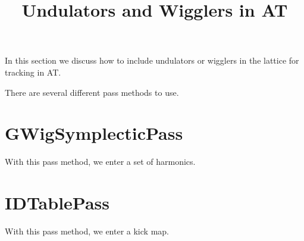 \documentclass[acus]{article}
\begin{document}
\title{Undulators and Wigglers in AT}
\maketitle

In this section we discuss how to include undulators or wigglers in the lattice for tracking in AT.

There are several different pass methods to use.
\section{GWigSymplecticPass}
With this pass method, we enter a set of harmonics.
\section{IDTablePass}
With this pass method, we enter a kick map.
\end{document}
